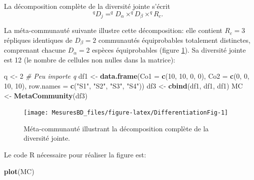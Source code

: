 \documentclass[
  11pt,
  french,
  a4paper,
  extrafontsizes,onecolumn,openright
  ]{memoir}
\newenvironment{Shaded}{\begin{snugshade}}{\end{snugshade}}
\newcommand{\CommentTok}[1]{\textcolor[rgb]{0.56,0.35,0.01}{\textit{#1}}}
\newcommand{\DataTypeTok}[1]{\textcolor[rgb]{0.13,0.29,0.53}{#1}}
\newcommand{\DecValTok}[1]{\textcolor[rgb]{0.00,0.00,0.81}{#1}}
\newcommand{\KeywordTok}[1]{\textcolor[rgb]{0.13,0.29,0.53}{\textbf{#1}}}
\newcommand{\NormalTok}[1]{#1}
\newcommand{\StringTok}[1]{\textcolor[rgb]{0.31,0.60,0.02}{#1}}
\begin{document}
La décomposition complète de la diversité jointe s'écrit
\begin{equation}
  \label{eq:DecJointe}
  ^{q}\!D_{j}= ^{q}\!D_{\alpha} \times ^{q}\!D_{\beta} \times ^{q}\!R_{c}.
\end{equation}

La méta-communauté suivante illustre cette décomposition: elle contient \(R_c=3\) répliques identiques de \(D_{\beta}=2\) communautés équiprobables totalement distinctes, comprenant chacune \(D_{\alpha}=2\) espèces équiprobables (figure \ref{fig:DifferentiationFig}).
Sa diversité jointe est 12 (le nombre de cellules non nulles dans la matrice):

\scriptsize

\begin{Shaded}
\begin{Highlighting}[]
\NormalTok{q <-}\StringTok{ }\DecValTok{2}  \CommentTok{# Peu importe q}
\NormalTok{df1 <-}\StringTok{ }\KeywordTok{data.frame}\NormalTok{(}\DataTypeTok{Co1 =} \KeywordTok{c}\NormalTok{(}\DecValTok{10}\NormalTok{, }\DecValTok{10}\NormalTok{, }\DecValTok{0}\NormalTok{, }\DecValTok{0}\NormalTok{), }\DataTypeTok{Co2 =} \KeywordTok{c}\NormalTok{(}\DecValTok{0}\NormalTok{, }\DecValTok{0}\NormalTok{, }\DecValTok{10}\NormalTok{, }\DecValTok{10}\NormalTok{),}
    \DataTypeTok{row.names =} \KeywordTok{c}\NormalTok{(}\StringTok{"S1"}\NormalTok{, }\StringTok{"S2"}\NormalTok{, }\StringTok{"S3"}\NormalTok{, }\StringTok{"S4"}\NormalTok{))}
\NormalTok{df3 <-}\StringTok{ }\KeywordTok{cbind}\NormalTok{(df1, df1, df1)}
\NormalTok{MC <-}\StringTok{ }\KeywordTok{MetaCommunity}\NormalTok{(df3)}
\end{Highlighting}
\end{Shaded}

\normalsize

\scriptsize

\begin{figure}

{\centering \texttt{[image: MesuresBD\_files/figure-latex/DifferentiationFig-1]} 

}

\caption{Méta-communauté illustrant la décomposition complète de la diversité jointe.}\label{fig:DifferentiationFig}
\end{figure}

\normalsize

Le code R nécessaire pour réaliser la figure est:

\scriptsize

\begin{Shaded}
\begin{Highlighting}[]
\KeywordTok{plot}\NormalTok{(MC)}
\end{Highlighting}
\end{Shaded}
\end{document}
